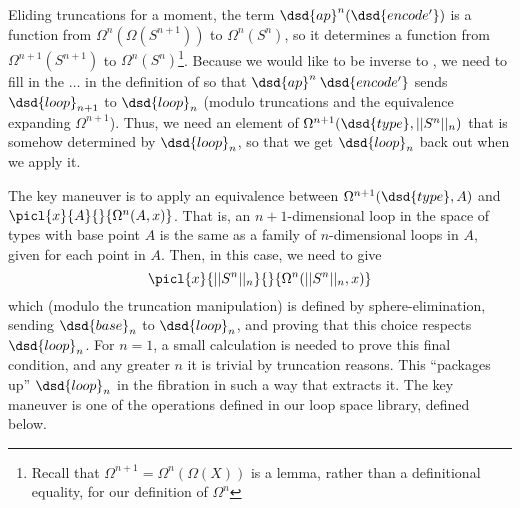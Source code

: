 Eliding truncations for a moment, the term $\dsd{ap}^n(\dsd{encode'})$
is a function from $\Omega^n(\Omega(S^{n+1}))$ to $\Omega^n(S^n)$, so it
determines a function from $\Omega^{n+1}(S^{n+1})$ to
$\Omega^n(S^n)$\footnote{Recall that $\Omega^{n+1} =
  \Omega^n(\Omega(X))$ is a lemma, rather than a definitional equality,
  for our definition of $\Omega^n$}.  Because we would like 
to be inverse to , we need to fill in the $\ldots$ in the
definition of  so that $\dsd{ap}^n \: \dsd{encode'}$ sends
$\dsd{loop}_{n+1}$ to $\dsd{loop}_n$ (modulo truncations and the
equivalence expanding $\Omega^{n+1}$).  Thus, we need an element of
$\Omega^{n+1}(\dsd{type},||S^n||_n)$ that is somehow determined by 
$\dsd{loop}_n$, so that we get $\dsd{loop}_n$ back out when we apply it.  

The key maneuver is to apply an equivalence between
$\Omega^{n+1}(\dsd{type},A)$ and $\picl{x}{A}{}{\Omega^n(A,x)}$.  That is,
an $n+1$-dimensional loop in the space of types with base point $A$ is
the same as a family of $n$-dimensional loops in $A$, given for each
point in $A$.  Then, in this case, we need to give 
\[
\picl{x}{||S^n||_n}{}{\Omega^n(||S^n||_n,x)}
\]
which (modulo the truncation manipulation) is defined by
sphere-elimination, sending $\dsd{base}_n$ to $\dsd{loop}_n$, and
proving that this choice respects $\dsd{loop}_n$.  For $n=1$, a small
calculation is needed to prove this final condition, and any greater $n$
it is trivial by truncation reasons.  This ``packages up''
$\dsd{loop}_n$ in the  fibration in such a way that
 extracts it.  The key maneuver is one of the operations
defined in our loop space library, defined below.  

